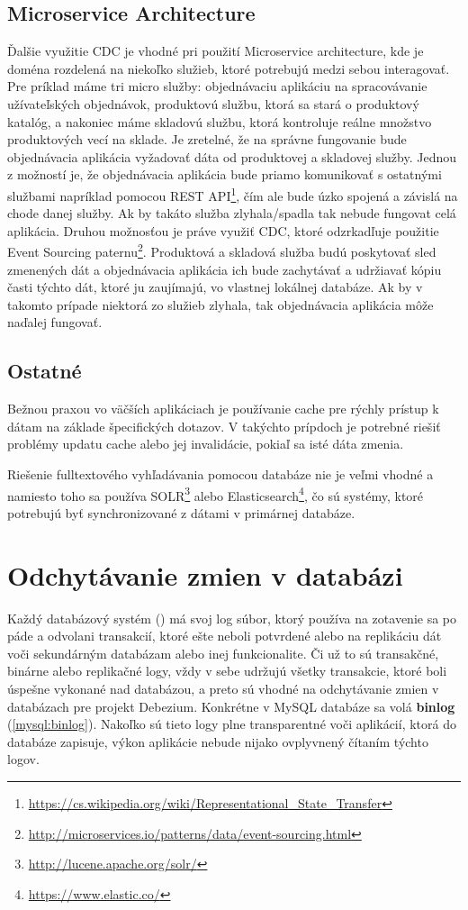 \subsection{Microservice Architecture}
Ďalšie využitie CDC je vhodné pri použití Microservice architecture, kde je doména rozdelená na niekoľko služieb, ktoré potrebujú medzi sebou interagovať. Pre príklad máme tri micro služby: objednávaciu aplikáciu na spracovávanie užívateľských objednávok, produktovú službu, ktorá sa stará o produktový katalóg, a nakoniec máme skladovú službu, ktorá kontroluje reálne množstvo produktových vecí na sklade. Je zretelné, že na správne fungovanie bude objednávacia aplikácia vyžadovať dáta od produktovej a skladovej služby. Jednou z možností je, že objednávacia aplikácia bude priamo komunikovať s ostatnými službami napríklad pomocou REST API\footnote{\url{https://cs.wikipedia.org/wiki/Representational_State_Transfer}}, čím ale bude úzko spojená a závislá na chode danej služby. Ak by takáto služba zlyhala/spadla tak nebude fungovat celá aplikácia. Druhou možnosťou je práve využiť CDC, ktoré odzrkadľuje použitie Event Sourcing paternu\footnote{\url{http://microservices.io/patterns/data/event-sourcing.html}}. Produktová a skladová služba budú poskytovať sled zmenených dát a objednávacia aplikácia ich bude zachytávať a udržiavať kópiu časti týchto dát, ktoré ju zaujímajú, vo vlastnej lokálnej databáze. Ak by v takomto prípade niektorá zo služieb zlyhala, tak objednávacia aplikácia môže naďalej fungovať.

\subsection{Ostatné}
Bežnou praxou vo väčších aplikáciach je používanie cache pre rýchly prístup k dátam na základe špecifických dotazov. V takýchto prípdoch je potrebné riešiť problémy updatu cache alebo jej invalidácie, pokiaľ sa isté dáta zmenia.

Riešenie fulltextového vyhľadávania pomocou databáze nie je veľmi vhodné a namiesto toho sa používa SOLR\footnote{\url{http://lucene.apache.org/solr/}} alebo Elasticsearch\footnote{\url{https://www.elastic.co/}}, čo sú systémy, ktoré potrebujú byť synchronizované z dátami v primárnej databáze. 


\section{Odchytávanie zmien v databázi}
Každý databázový systém () má svoj log súbor, ktorý používa na zotavenie sa po páde a odvolani transakcií, ktoré ešte neboli potvrdené alebo na replikáciu dát voči sekundárným databázam alebo inej funkcionalite. Či už to sú transakčné, binárne alebo replikačné logy, vždy v sebe udržujú všetky transakcie, ktoré boli úspešne vykonané nad databázou, a preto sú vhodné na odchytávanie zmien v databázach pre projekt Debezium. Konkrétne v MySQL databáze sa volá \textbf{binlog} (\ref{mysql:binlog}). Nakoľko sú tieto logy plne transparentné voči aplikácií, ktorá do databáze zapisuje, výkon aplikácie nebude nijako ovplyvnený čítaním týchto logov.

